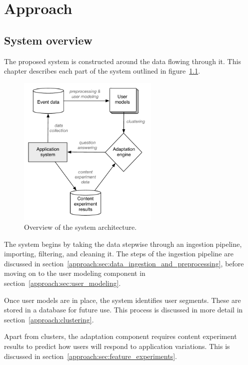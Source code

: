 \chapter{Approach}

\label{Chapter3}


\section{System overview} %
\label{approach:sec:system_overview}

The proposed system is constructed around the data flowing through it. This chapter describes each part of the system outlined in figure~\ref{fig:system-architecture}.

\begin{figure}[b]
  \centering
    \includegraphics[width=0.6\textwidth]{Figures/system-architecture}
    \caption{Overview of the system architecture.}
    \label{fig:system-architecture}
\end{figure}

The system begins by taking the data stepwise through an ingestion pipeline, importing, filtering, and cleaning it. The steps of the ingestion pipeline are discussed in section~\ref{approach:sec:data_ingestion_and_preprocessing}, before moving on to the user modeling component in section~\ref{approach:sec:user_modeling}.

Once user models are in place, the system identifies user segments. These are stored in a database for future use. This process is discussed in more detail in section~\ref{approach:clustering}.

Apart from clusters, the adaptation component requires content experiment results to predict how users will respond to application variations. This is discussed in section~\ref{approach:sec:feature_experiments}.

